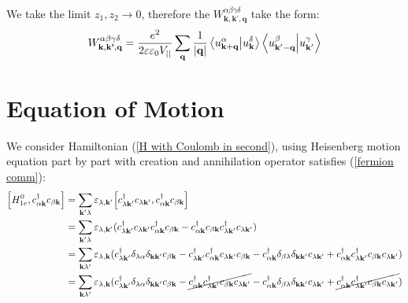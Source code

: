 \documentclass[12pt,english,a4paper]{article}
\newcommand{\dg}{\dagger}
\begin{document}
\begin{appendices}
\begin{align}
\end{align}
\quad We take the limit $z_1, z_2 \to 0$, therefore the $W^{\alpha\beta\gamma \delta}_{\textbf{k},\textbf{k'},\textbf{q}}$ take the form:
\begin{equation}
	W^{\alpha\beta\gamma \delta}_{\textbf{k},\textbf{k'},\textbf{q}} = \frac{e^2}{2\varepsilon \varepsilon_0 V_{||}} \sum_{\textbf{q}} \frac{1}{|\textbf{q}|} \braket{u_{\textbf{k}+\textbf{q}}^{\alpha}}{u^{\delta}_{\textbf{k}}} \braket{u ^{\beta}_{\textbf{k}'-\textbf{q}}}{u^\gamma_{\textbf{k}'}}
\end{equation}
\newpage
\section{Equation of Motion}
\label{Motion Equation}
\quad We consider Hamiltonian (\ref{H with Coulomb in second}), using Heisenberg motion equation part by part with creation and annihilation operator satisfies (\ref{fermion comm}):
\begin{align}
	\comm{H^{0}_{1e}}{c^\dg_{\alpha \textbf{k}} c_{\beta \textbf{k}}} &= \sum_{\textbf{k}' \lambda} \varepsilon_{\lambda,\textbf{k}'} \comm{c^\dg_{\lambda \textbf{k}'} c_{\lambda \textbf{k}'}}{c^\dg_{\alpha \textbf{k}} c_{\beta \textbf{k}}} \nonumber \\
	&= \sum_{\textbf{k}' \lambda} \varepsilon_{\lambda,\textbf{k}'} (c^\dg_{\lambda \textbf{k}'} c_{\lambda \textbf{k}'}c^\dg_{\alpha \textbf{k}} c_{\beta \textbf{k}} - c^\dg_{\alpha \textbf{k}} c_{\beta \textbf{k}}c^\dg_{\lambda \textbf{k}'} c_{\lambda \textbf{k}'})\nonumber \\
	& = \sum_{\textbf{k}\lambda'} \varepsilon_{\lambda,\textbf{k}}(c^\dg_{\lambda \textbf{k}'} \delta_{\lambda \alpha}\delta_{\textbf{k}\textbf{k}'} c_{\beta \textbf{k}} 
	- c^\dg_{\lambda \textbf{k}'}c^\dg_{\alpha \textbf{k}} c_{\lambda \textbf{k}'} c_{\beta \textbf{k}} 
	- c^\dg_{\alpha \textbf{k}} \delta_{\beta\lambda}\delta_{\textbf{k}\textbf{k}'} c_{\lambda \textbf{k}'} 
	+ c^\dg_{\alpha \textbf{k}}c^\dg_{\lambda \textbf{k}'} c_{\beta \textbf{k}} c_{\lambda \textbf{k}'}) \nonumber\\
	&= \sum_{\textbf{k}\lambda'} \varepsilon_{\lambda,\textbf{k}}(c^\dg_{\lambda \textbf{k}'} \delta_{\lambda \alpha}\delta_{\textbf{k}\textbf{k}'} c_{\beta \textbf{k}} 
	- \cancel{c^\dg_{\alpha \textbf{k}}c^\dg_{\lambda \textbf{k}'} c_{\beta \textbf{k}} c_{\lambda \textbf{k}'} }
	- c^\dg_{\alpha \textbf{k}} \delta_{\beta\lambda}\delta_{\textbf{k}\textbf{k}'} c_{\lambda \textbf{k}'} 
	+ \cancel{c^\dg_{\alpha \textbf{k}}c^\dg_{\lambda \textbf{k}'} c_{\beta \textbf{k}} c_{\lambda \textbf{k}'}})\nonumber\\\label{Energy commu}

\end{align}
\end{appendices}
\end{document}
